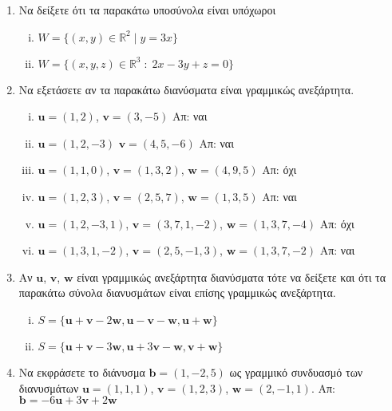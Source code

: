 \begin{enumerate}
  \item Να δείξετε ότι τα παρακάτω υποσύνολα είναι υπόχωροι
    \begin{enumerate}[(i)]
      \item $ W = \{ (x,y) \in \mathbb{R}^{2} \mid y = 3x \} $ 
      \item $ W = \{(x,y,z)\in \mathbb{R}^{3} \; : \; 2x-3y+z=0 \} $
    \end{enumerate}

  \item\label{ask:lineks} Να εξετάσετε αν τα παρακάτω διανύσματα είναι γραμμικώς 
    ανεξάρτητα.
    \begin{enumerate}[(i)]
      \item $ \mathbf{u} = (1,2) $, $ \mathbf{v} = (3,-5) $ \hfill Απ: ναι
      \item $ \mathbf{u} = (1,2,-3) $ $ \mathbf{v} = (4,5,-6) $ \hfill Απ: ναι
      \item $ \mathbf{u} = (1,1,0)$, $ \mathbf{v} = (1,3,2)$, $ \mathbf{w} = (4,9,5) $ 
        \hfill Απ: όχι 
      \item $ \mathbf{u} = (1,2,3)$, $ \mathbf{v} = (2,5,7)$, $ \mathbf{w} = (1,3,5) $ 
        \hfill Απ: ναι 
      \item $ \mathbf{u} = (1,2,-3,1) $, $ \mathbf{v} = (3,7,1,-2) $, $ \mathbf{w} =
        (1,3,7,-4) $ \hfill Απ: όχι
      \item $ \mathbf{u} = (1,3,1,-2) $, $ \mathbf{v} = (2,5,-1,3) $, $ \mathbf{w} =
        (1,3,7,-2) $ \hfill Απ: ναι
    \end{enumerate}

  \item Αν $ \mathbf{u} $, $ \mathbf{v} $, $ \mathbf{w} $ είναι γραμμικώς 
    ανεξάρτητα διανύσματα τότε να δείξετε και ότι τα παρακάτω σύνολα διανυσμάτων 
    είναι επίσης γραμμικώς ανεξάρτητα.
    \begin{enumerate}[(i)]
      \item $ S = \{ \mathbf{u} + \mathbf{v} - 2 \mathbf{w}, \mathbf{u} - \mathbf{v} -
        \mathbf{w}, \mathbf{u} + \mathbf{w} \} $
      \item $ S = \{ \mathbf{u} + \mathbf{v} - 3 \mathbf{w}, \mathbf{u} + 3 \mathbf{v} -
        \mathbf{w}, \mathbf{v} + \mathbf{w}\}  $
    \end{enumerate}

  \item\label{ask:eksart} Να εκφράσετε το διάνυσμα $ \mathbf{b} = (1,-2,5) $ ως γραμμικό 
    συνδυασμό των διανυσμάτων $ \mathbf{u} = (1,1,1)$, $ \mathbf{v} = (1,2,3)$, 
    $ \mathbf{w} = (2,-1,1) $.
    \hfill Απ: $ \mathbf{b} = -6 \mathbf{u} + 3 \mathbf{v} +2 \mathbf{w} $ 	


\end{enumerate}
